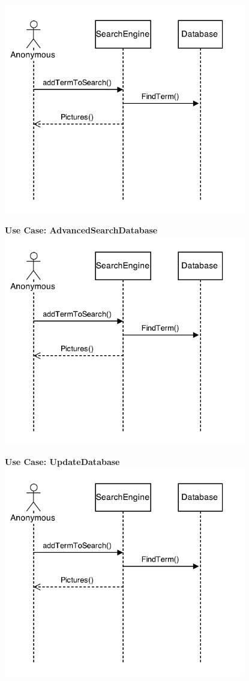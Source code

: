 \documentclass[12pt,a4paper]{article}
\begin{document}
\includegraphics[height=92mm]{UseCase1.png}

{\bf Use Case: AdvancedSearchDatabase}\\

\includegraphics[height=92mm]{UseCase1.png}

{\bf Use Case: UpdateDatabase}\\

\includegraphics[height=92mm]{UseCase1.png}
\end{document}
